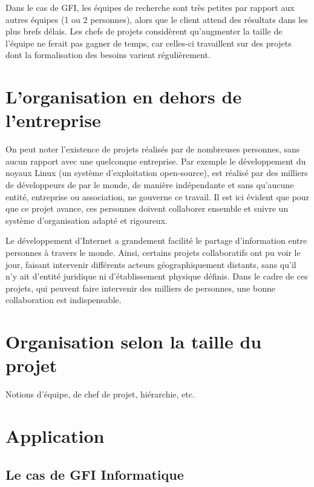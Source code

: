 \begin{app}
Dans le cas de GFI, les équipes de recherche sont très petites par rapport aux autres équipes (1 ou 2 personnes), alors que le client attend des résultats dans les plus brefs délais. Les chefs de projets considèrent qu'augmenter la taille de l'équipe ne ferait pas gagner de temps, car celles-ci travaillent sur des projets dont la formalisation des besoins varient régulièrement.
\end{app}

\section{L'organisation en dehors de l'entreprise}

On peut noter l'existence de projets réalisés par de nombreuses personnes, sans aucun rapport avec une quelconque entreprise. Par exemple le développement du noyaux Linux (un système d'exploitation open-source), est réalisé par des milliers de développeurs de par le monde, de manière indépendante et sans qu'aucune entité, entreprise ou  association, ne gouverne ce travail. Il est ici évident que pour que ce projet avance, ces personnes doivent collaborer ensemble et suivre un système d'organisation adapté et rigoureux.

Le développement d'Internet a grandement facilité le partage d'information entre personnes à travers le monde. Ainsi, certains projets collaboratifs ont pu voir le jour, faisant intervenir différents acteurs géographiquement distants, sans qu'il n'y ait d'entité juridique ni d'établissement physique définis. Dans le cadre de ces projets, qui peuvent faire intervenir des milliers de personnes, une bonne collaboration est indispensable.

\section{Organisation selon la taille du projet}

Notions d'équipe, de chef de projet, hiérarchie, etc.

\section{Application}

\subsection{Le cas de GFI Informatique}

